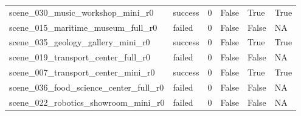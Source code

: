 \begin{tabular}{llllll}
scene\_030\_music\_workshop\_mini\_r0 & success & 0 & False & True & True \\
scene\_015\_maritime\_museum\_full\_r0 & failed & 0 & False & False & NA \\
scene\_035\_geology\_gallery\_mini\_r0 & success & 0 & False & True & True \\
scene\_019\_transport\_center\_full\_r0 & failed & 0 & False & False & NA \\
scene\_007\_transport\_center\_mini\_r0 & success & 0 & False & True & True \\
scene\_036\_food\_science\_center\_full\_r0 & failed & 0 & False & False & NA \\
scene\_022\_robotics\_showroom\_mini\_r0 & failed & 0 & False & False & NA \\
\bottomrule
\end{tabular}
